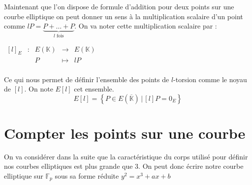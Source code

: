 \documentclass{article}
\begin{document}
Maintenant que l'on dispose de formule d'addition pour deux points sur une courbe elliptique on peut donner un sens à la multiplication scalaire d'un point comme $lP = \underbrace{P + \ldots + P}_{l \text{ fois}}$. On va noter cette multiplication scalaire par :
\newline

$\begin{array}{ccccc}
[l]_E & : & E(\mathbb{K}) & \to & E(\mathbb{K}) \\
 & & P & \mapsto & lP\\
\end{array}$

Ce qui nous permet de définir l'ensemble des points de $l$-torsion comme le noyau de $[l]$. On note $E[l]$ cet ensemble.
\newline
$$E[l] = \left\{ P \in E(\overline{\mathbb{K}}) \, | \, [l]P = 0_E \right\} $$

\section{Compter les points sur une courbe}
On va considérer dans la suite que la caractéristique du corps utilisé pour définir nos courbes elliptiques est plus grande que $3$. On peut donc écrire notre courbe elliptique sur $\mathbb{F}_p$ sous sa forme réduite $y^2 = x^3 + ax+b$
\end{document}
